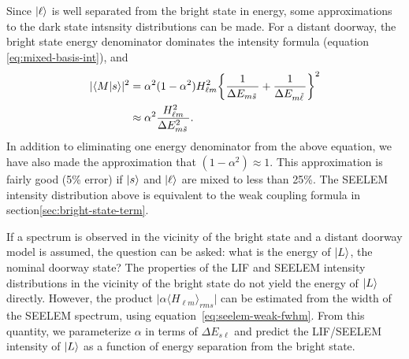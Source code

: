 \documentclass[12pt]{mitthesis}
\newcommand{\ts}{\tilde{s}\,}
\newcommand{\tl}{\tilde{\ell}\,}
\begin{document}
Since $\mathinner{|{\ell}\rangle}$ is well separated from the bright state in energy,
some approximations to the dark state intsnsity distributions can be
made.  For a distant doorway, the bright state energy denominator
dominates the intensity formula (equation \ref{eq:mixed-basis-int}),
and
\begin{equation}
  \label{eq:distant-lif}
  \begin{split}
  \lvert \braket{M|s} \rvert^2& = 
  \alpha^2 (1-\alpha^2) H_{\ell m}^2 
   \biggl \lbrace 
   \frac{1}{\Delta E_{m \ts}} +\frac{1}{\Delta E_{m \tl}}
   \biggr \rbrace^2\\
   & \approx \alpha^2 \frac{H_{\ell m}^2}{\Delta E_{m \ts}^2}.\\
   \end{split}
\end{equation}
In addition to eliminating one energy denominator from the above
equation, we have also made the approximation that $(1-\alpha^2)
\approx 1$.  This approximation is fairly good (5\% error) if
$\mathinner{|{s}\rangle}$ and $\mathinner{|{\ell}\rangle}$ are mixed to less than 25\%.  The SEELEM
intensity distribution above is equivalent to the weak coupling
formula in section\ref{sec:bright-state-term}.

If a spectrum is observed in the vicinity of the bright state and a
distant doorway model is assumed, the question can be asked: what is
the energy of $\mathinner{|{L}\rangle}$, the nominal doorway state?  The properties of
the LIF and SEELEM intensity distributions in the vicinity of the
bright state do not yield the energy of $\mathinner{|{L}\rangle}$ directly.  However,
the product $\lvert \alpha \langle H_{\ell m} \rangle_{rms} \rvert$
can be estimated from the width of the SEELEM spectrum, using
equation~\ref{eq:seelem-weak-fwhm}.  From this quantity, we
parameterize $\alpha$ in terms of $\Delta E_{s\ell}$ and predict the
LIF/SEELEM intensity of $\mathinner{|{L}\rangle}$ as a function of energy separation
from the bright state.
\end{document}

